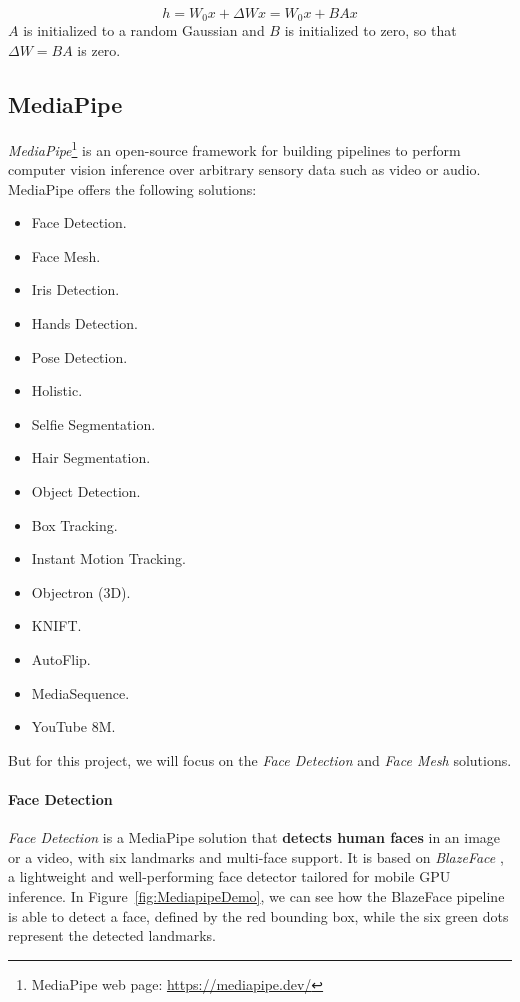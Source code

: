 \documentclass[preprint]{elsarticle}
\begin{document}
\begin{equation}
	h = W_0x + \Delta Wx = W_0x + BAx
\end{equation}
$A$ is initialized to a random Gaussian and $B$ is initialized to zero, so that
$\Delta W = BA$ is zero.



\subsection{MediaPipe}

\emph{MediaPipe}\footnote{MediaPipe web page: \url{https://mediapipe.dev/}} 
is an open-source framework for building pipelines to perform computer vision 
inference over arbitrary sensory data such as video or audio.
MediaPipe offers the following solutions:

\begin{itemize}
	\item Face Detection.
	\item Face Mesh.
	\item Iris Detection.
	\item Hands Detection.
	\item Pose Detection.
	\item Holistic.
	\item Selfie Segmentation.
	\item Hair Segmentation.
	\item Object Detection.
	\item Box Tracking.
	\item Instant Motion Tracking.
	\item Objectron (3D).
	\item KNIFT.
	\item AutoFlip.
	\item MediaSequence.
	\item YouTube 8M.
\end{itemize}
But for this project, we will focus on the \emph{Face Detection} and \emph{Face Mesh} solutions.

\paragraph{Face Detection}


\emph{Face Detection} is a MediaPipe solution that \textbf{detects human faces} in an image or a video,
with six landmarks and multi-face support.
It is based on \emph{BlazeFace} \cite{bazarevsky2019blazeface}, a lightweight and well-performing 
face detector tailored for mobile GPU inference.
In Figure~\ref{fig:MediapipeDemo}, we can see how the BlazeFace pipeline is able to detect a face, defined by the red bounding box, while the six green dots represent the detected landmarks.
\end{document}
